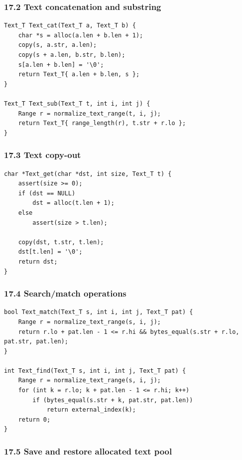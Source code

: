 \documentclass[11pt]{article}
\begin{document}
\subsubsection{17.2 Text concatenation and substring}\label{text-concatenation-and-substring}

\begin{verbatim}
Text_T Text_cat(Text_T a, Text_T b) {
    char *s = alloc(a.len + b.len + 1);
    copy(s, a.str, a.len);
    copy(s + a.len, b.str, b.len);
    s[a.len + b.len] = '\0';
    return Text_T{ a.len + b.len, s };
}

Text_T Text_sub(Text_T t, int i, int j) {
    Range r = normalize_text_range(t, i, j);
    return Text_T{ range_length(r), t.str + r.lo };
}
\end{verbatim}

\subsubsection{17.3 Text copy-out}\label{text-copy-out}

\begin{verbatim}
char *Text_get(char *dst, int size, Text_T t) {
    assert(size >= 0);
    if (dst == NULL)
        dst = alloc(t.len + 1);
    else
        assert(size > t.len);

    copy(dst, t.str, t.len);
    dst[t.len] = '\0';
    return dst;
}
\end{verbatim}

\subsubsection{17.4 Search/match operations}\label{searchmatch-operations}

\begin{verbatim}
bool Text_match(Text_T s, int i, int j, Text_T pat) {
    Range r = normalize_text_range(s, i, j);
    return r.lo + pat.len - 1 <= r.hi && bytes_equal(s.str + r.lo, pat.str, pat.len);
}

int Text_find(Text_T s, int i, int j, Text_T pat) {
    Range r = normalize_text_range(s, i, j);
    for (int k = r.lo; k + pat.len - 1 <= r.hi; k++)
        if (bytes_equal(s.str + k, pat.str, pat.len))
            return external_index(k);
    return 0;
}
\end{verbatim}

\subsubsection{17.5 Save and restore allocated text pool}\label{save-and-restore-allocated-text-pool}
\end{document}
